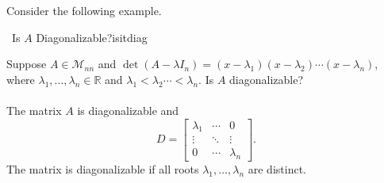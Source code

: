         Consider the following example.
        \begin{example}{\Difficulty\,\Difficulty\,\,Is \(A\) Diagonalizable?}{isitdiag}
            
            Suppose \(A\in\mathcal{M}_{nn}\) and \(\det(A-\lambda I_n)=(x-\lambda_1)(x-\lambda_2)\cdots(x-\lambda_n)\), where \(\lambda_1,\ldots,\lambda_n\in\mathbb{R}\) and \(\lambda_1<\lambda_2\cdots<\lambda_n\). Is \(A\) diagonalizable?
            \\
            \\
            The matrix \(A\) is diagonalizable and
            \begin{equation*}
                D=\begin{bmatrix} 
                    \lambda_1 & \cdots & 0 \\
                    \vdots & \ddots & \vdots \\
                    0 & \cdots & \lambda_n
                \end{bmatrix}.
            \end{equation*}
            The matrix is diagonalizable if all roots \(\lambda_1,\ldots,\lambda_n\) are distinct.

        \end{example}
